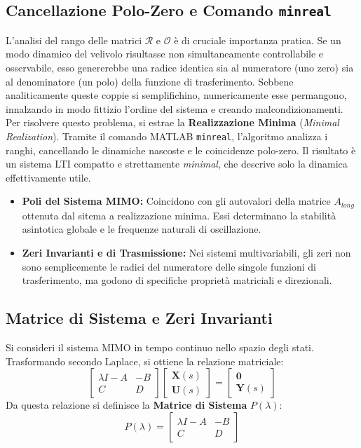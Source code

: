 \subsection{Cancellazione Polo-Zero e Comando \texttt{minreal}}
L'analisi del rango delle matrici $\mathcal{R}$ e $\mathcal{O}$ è di cruciale importanza pratica. Se un modo dinamico del velivolo risultasse non simultaneamente controllabile e osservabile, esso genererebbe una radice identica sia al numeratore (uno zero) sia al denominatore (un polo) della funzione di trasferimento. Sebbene analiticamente queste coppie si semplifichino, numericamente esse permangono, innalzando in modo fittizio l'ordine del sistema e creando malcondizionamenti.
Per risolvere questo problema, si estrae la \textbf{Realizzazione Minima} (\textit{Minimal Realization}). Tramite il comando MATLAB \texttt{minreal}, l'algoritmo analizza i ranghi, cancellando le dinamiche nascoste e le coincidenze polo-zero. Il risultato è un sistema LTI compatto e strettamente \textit{minimal}, che descrive solo la dinamica effettivamente utile.



\begin{itemize}
    \item \textbf{Poli del Sistema MIMO:} Coincidono con gli autovalori della matrice $A_{long}$ ottenuta dal sitema a realizzazione minima. Essi determinano la stabilità asintotica globale e le frequenze naturali di oscillazione.
    \item \textbf{Zeri Invarianti e di Trasmissione:} Nei sistemi multivariabili, gli zeri non sono semplicemente le radici del numeratore delle singole funzioni di trasferimento, ma godono di specifiche proprietà matriciali e direzionali. 
\end{itemize}

\subsection{Matrice di Sistema e Zeri Invarianti}
Si consideri il sistema MIMO in tempo continuo nello spazio degli stati. Trasformando secondo Laplace, si ottiene la relazione matriciale:
\begin{equation}
\begin{bmatrix}  \lambda I - A & -B \\ C & D \end{bmatrix} \begin{bmatrix} \mathbf{X}(s) \\ \mathbf{U}(s) \end{bmatrix} = \begin{bmatrix} \mathbf{0} \\ \mathbf{Y}(s) \end{bmatrix}
\end{equation} 
Da questa relazione si definisce la \textbf{Matrice di Sistema} $P(\lambda)$:
\begin{equation}
P(\lambda) = \begin{bmatrix}  \lambda I - A & -B \\ C & D \end{bmatrix}
\end{equation} 

